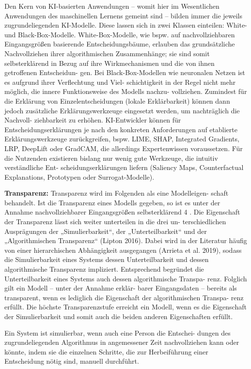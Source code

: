 \documentclass[11pt,a4paper]{article}
\numberwithin{equation}{section}
\begin{document}
	
	Den Kern von KI-basierten Anwendungen – womit hier im Wesentlichen Anwendungen des
	maschinellen Lernens gemeint sind – bilden immer die jeweils zugrundeliegenden KI-Modelle.
	Diese lassen sich in zwei Klassen einteilen: White- und Black-Box-Modelle. White-Box-Modelle,
	wie bspw. auf nachvollziehbaren Eingangsgrößen basierende Entscheidungsbäume, erlauben
	das grundsätzliche Nachvollziehen ihrer algorithmischen Zusammenhänge; sie sind somit
	selbsterklärend in Bezug auf ihre Wirkmechanismen und die von ihnen getroffenen Entscheidun-
	gen. Bei Black-Box-Modellen wie neuronalen Netzen ist es aufgrund ihrer Verflechtung und Viel-
	schichtigkeit in der Regel nicht mehr möglich, die innere Funktionsweise des Modells nachzu-
	vollziehen. Zumindest für die Erklärung von Einzelentscheidungen (lokale Erklärbarkeit) können
	dann jedoch zusätzliche Erklärungswerkzeuge eingesetzt werden, um nachträglich die Nachvoll-
	ziehbarkeit zu erhöhen. KI-Entwickler können für Entscheidungserklärungen je nach den
	konkreten Anforderungen auf etablierte Erklärungswerkzeuge zurückgreifen, bspw. LIME, SHAP,
	Integrated Gradients, LRP, DeepLift oder GradCAM, die allerdings Expertenwissen voraussetzen.
	Für die Nutzenden existieren bislang nur wenig gute Werkzeuge, die intuitiv verständliche Ent-
	scheidungserklärungen liefern (Saliency Maps, Counterfactual Explanations, Prototypen oder
	Surrogat-Modelle).
	
	\noindent \textbf{Transparenz: }
	Transparenz wird im Folgenden als eine Modelleigen-
	schaft behandelt. Ist die Transparenz eines Modells
	gegeben, so ist es unter der Annahme nachvollziehbarer
	Eingangsgrößen selbsterklärend 4 . Die Eigenschaft der
	Transparenz lässt sich weiter unterteilen in die drei un-
	terschiedlichen Ausprägungen der „Simulierbarkeit“, der
	„Unterteilbarkeit“ und der „Algorithmischen Transparenz“
	(Lipton 2016). Dabei wird in der Literatur häufig von einer
	hierarchischen Abhängigkeit ausgegangen (Arrieta et al.
	2019), sodass die Simulierbarkeit eines Systems dessen
	Unterteilbarkeit und dessen algorithmische Transparenz
	impliziert. Entsprechend begründet die Unterteilbarkeit
	eines Systems auch dessen algorithmische Transpa-
	renz. Folglich gilt ein Modell – unter der Annahme erklär-
	barer Eingangsdaten – bereits als transparent, wenn es
	lediglich die Eigenschaft der algorithmischen Transpa-
	renz erfüllt. Die höchste Transparenzstufe erreicht ein
	Modell, wenn es die Eigenschaft der Simulierbarkeit und
	somit auch die beiden anderen
	Eigenschaften erfüllt.
	
	Ein System ist simulierbar, wenn
	auch eine Person die Entschei-
	dungen des zugrundeliegenden
	Algorithmus in angemessener
	Zeit nachvollziehen kann oder
	könnte, indem sie die einzelnen
	Schritte, die zur Herbeiführung
	einer Entscheidung nötig sind,
	manuell durchführt.	
	
\end{document}
